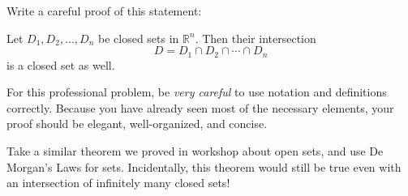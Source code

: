 \begin{problem}
Write a careful proof of this statement:

\begin{theorem}
Let $D_1,D_2,...,D_n$ be closed sets in $\mathbb{R}^n$. Then their intersection
\[
D=D_1\cap D_2\cap\cdots\cap D_n
\]
is a closed set as well.
\end{theorem}

For this professional problem, be \emph{very careful} to use notation and definitions correctly. Because you have already seen most of the necessary elements, your proof should be elegant, well-organized, and concise.

\begin{hint}
Take a similar theorem we proved in workshop about open sets, and use De Morgan's Laws for sets. Incidentally, this theorem would still be true even with an intersection of infinitely many closed sets!
\end{hint}
\end{problem}